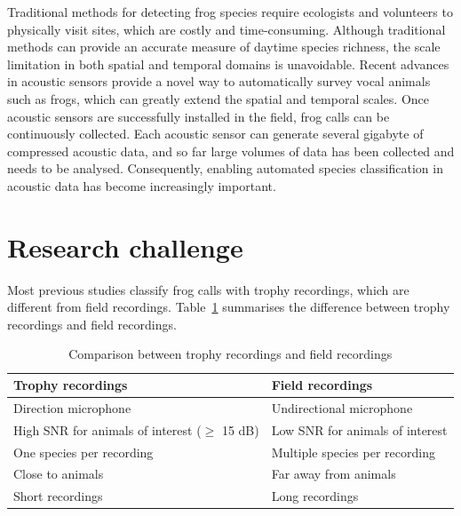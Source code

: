 Traditional methods for detecting frog species require ecologists and volunteers to physically visit sites, which are costly and time-consuming. 
Although traditional methods can provide an accurate measure of daytime species richness, the scale limitation in both spatial and temporal domains is unavoidable. Recent advances in acoustic sensors provide a novel way to automatically survey vocal animals such as frogs, which can greatly extend the spatial and temporal scales. Once acoustic sensors are successfully installed in the field, frog calls can be continuously collected. Each acoustic sensor can generate several gigabyte of compressed acoustic data, and so far large volumes of data has been collected and needs to be analysed. Consequently, enabling automated species classification in acoustic data has become increasingly important.

\section{Research challenge}

Most previous studies classify frog calls with trophy recordings, which are different from field recordings. Table~\ref{tab:recordings} summarises the difference between trophy recordings and field recordings. 

\begin{table}[htb!]
\centering
\caption{Comparison between trophy recordings and field recordings}
\label{tab:recordings}
\begin{tabular}{ll}
\hline\hline
\textbf{Trophy recordings}                                                                      & \textbf{Field recordings}                                          \\ \hline
Direction microphone                                                                            & Undirectional microphone                                                  \\ 
High SNR for animals of interest ($\geq$ 15 dB) & Low SNR for animals of interest \\ 
One species per recording                                                                       & Multiple species per recording                                            \\ 
Close to animals                                                                                & Far away from animals                                                     \\ 
Short recordings                                                                                & Long recordings                                                           \\ \hline\hline
\end{tabular}
\end{table}



